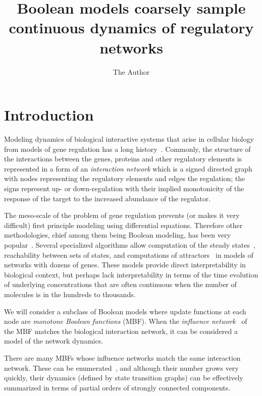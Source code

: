 \documentclass[12pt, notitlepage]{amsart}
\title{Boolean models coarsely sample continuous dynamics of regulatory networks }
\author{The Author}
\theoremstyle{definition}
\begin{document}
\maketitle

\section{Introduction}
Modeling dynamics of biological interactive systems that arise in cellular biology from models of gene regulation has a long history~\cite{alonbook,Milo02,deJong2004, Thomas95, Thieffry99, Jaoude16, Glass1975,shmulevich02}.
Commonly, the structure of the interactions between the genes, proteins and other regulatory elements is represented in a form of an \textit{interaction network}  which is a signed directed graph with nodes representing the regulatory elements and edges the regulation; the signs represent up- or down-regulation with their implied monotonicity of the response of the target to the increased abundance of the regulator.

The meso-scale of the problem of gene regulation prevents (or makes it very difficult)  first principle modeling using  differential equations.
Therefore other methodologies, chief among them being Boolean modeling, has been very popular~\cite{CH2011,chaouiya2016,chatain2020,Albert2017,Assmann2014,Thieffry2016,Zhang2008,aledo2024,pauleve2019,pauleve2020}. Several specialized algorithms allow computation of the steady states~\cite{SAT,melkman2013,Mori2022}, reachability between sets of states, and computations of attractors~\cite{tamura2009,dubrova2012,Mori2022} in models of networks with dozens of genes. These models provide direct interpretability in biological context, but perhaps lack interpretability in terms of the time evolution of underlying concentrations that are often continuous when the number of molecules is in the hundreds to thousands.

We will consider a subclass of Boolean models where update functions at each node are \textit{monotone Boolean functions} (MBF). When the  \textit{ influence network}~\cite{rout2020}  of the MBF matches the  biological interaction  network, it can be considered a model  of the network dynamics.

There are many MBFs whose influence networks match the same interaction network. These can be enumerated~\cite{Gedeon24b,monteiro2024},  and although their number grows very quickly, their dynamics (defined by state transition graphs) can be effectively summarized in terms of partial orders of strongly connected components.
\end{document}
